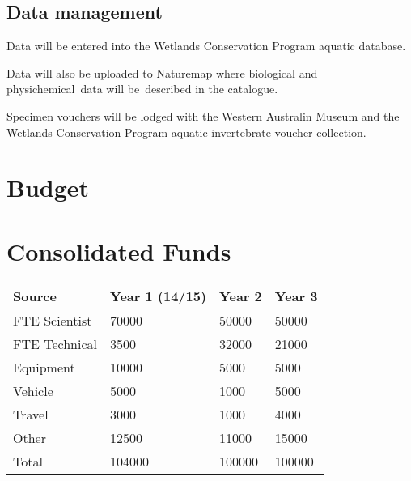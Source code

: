 \documentclass[version=last,
    paper=a4, %
    10pt, %
    usenames,
    dvipsnames,
    oneside, %
    headings=openany, %
    DIV=15 %
]{scrbook}
\begin{document}
\subsection*{Data management}
Data will be entered into the Wetlands Conservation Program aquatic
database.

Data will also be uploaded to Naturemap where biological and
physichemical~data will be~described in the catalogue.

Specimen vouchers will be lodged with the Western Australin Museum and
the Wetlands Conservation Program aquatic invertebrate voucher
collection.




\section*{Budget}

\section*{Consolidated Funds }



\begin{longtabu} to \linewidth { |  X | X | X | X | }
\hline
{}
Source & Year 1 (14/15) & Year 2 & Year 3\\
\hline
\endhead



FTE Scientist & 70000 & 50000 & 50000\\



FTE Technical & 3500 & 32000 & 21000\\



Equipment & 10000 & 5000 & 5000\\



Vehicle & 5000 & 1000 & 5000\\



Travel & 3000 & 1000 & 4000\\



Other & 12500 & 11000 & 15000\\



Total & 104000 & 100000 & 100000\\


\hline
\end{longtabu}
\end{document}
